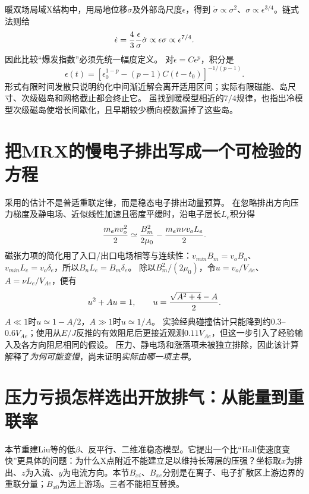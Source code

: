 \documentclass[UTF8,a4paper,11pt,openany,fontset=fandol]{ctexbook}
\begin{document}
暖双场局域X结构中，\citet{L214}用局地位移$\sigma$及外部岛尺度$\epsilon$，得到
$\dot\sigma\propto\sigma^2$、$\sigma\propto\epsilon^{3/4}$。链式法则给
\begin{equation}
 \dot\epsilon={4\over3}{\epsilon\over\sigma}\dot\sigma
 \propto\epsilon\sigma\propto\epsilon^{7/4}.
\end{equation}
因此比较“爆发指数”必须先统一幅度定义。
对$\dot\epsilon=C\epsilon^p$，积分是
\begin{equation}
 \epsilon(t)=\left[\epsilon_0^{1-p}-(p-1)C(t-t_0)\right]^{-1/(p-1)}.
\end{equation}
形式有限时间发散只说明约化中间渐近解会离开适用区间；实际有限磁能、岛尺寸、次级磁岛和网格截止都会终止它。
\citet{F697}虽找到暖模型相近的$7/4$规律，也指出冷模型次级磁岛使增长间歇化，且早期较少横向模数漏掉了这些岛。

\section{把MRX的慢电子排出写成一个可检验的方程}
\citet{L119}采用的估计不是普适重联定律，而是稳态电子排出动量预算。
在忽略排出方向压力梯度及静电场、近似线性加速且密度平缓时，沿电子层长$L_e$积分得
\begin{equation}
 {m_en v_o^2\over2}\simeq{B_m^2\over2\mu_0}
 -{m_en\nu v_oL_e\over2}.
\end{equation}
磁张力项的简化用了入口/出口电场相等与连续性：$v_{
m in}B_m=v_oB_n$、$v_{
m in}L_e=v_o\delta_e$，所以$B_nL_e=B_m\delta_e$。
除以$B_m^2/(2\mu_0)$，令$u=v_o/V_{\!Ae}$、$A=\nu L_e/V_{\!Ae}$，便有
\begin{equation}
 u^2+Au=1,\qquad u={\sqrt{A^2+4}-A\over2}.
\end{equation}
$A\ll1$时$u\simeq1-A/2$，$A\gg1$时$u\simeq1/A$。
实验经典碰撞估计只能降到约$0.3$--$0.6V_{\!Ae}$；使用从$E/J$反推的有效阻尼后更接近观测$0.11V_{\!Ae}$，但这一步引入了经验输入及各方向阻尼相同的假设。
压力、静电场和涨落项未被独立排除，因此该计算解释了\emph{为何可能变慢}，尚未证明\emph{实际由哪一项主导}。

\section{压力亏损怎样选出开放排气：从能量到重联率}
\label{sec:pressure-rate}
本节重建Liu等的低$\beta$、反平行、二维准稳态模型\citep{F589}。它提出一个比“Hall使速度变快”更具体的问题：为什么X点附近不能建立足以维持长薄层的压强？坐标取$x$为排出、$z$为入流、$y$为电流方向。本节$B_{xi}$、$B_{xe}$分别是在离子、电子扩散区上游边界的重联分量；$B_{x0}$为远上游场。三者不能相互替换。
\end{document}
